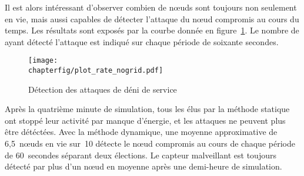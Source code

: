 Il est alors intéressant d'observer combien de nœuds sont toujours non seulement en vie, mais aussi capables de détecter l'attaque du nœud compromis au cours du temps.
Les résultats sont exposés par la courbe donnée en figure~\ref{sa:fig:detection-dos}.
Le nombre de \cns ayant détecté l'attaque est indiqué sur chaque période de soixante secondes.
\begin{figure}[H]
    \centering
    \texttt{[image: \\chapterfig/plot\_rate\_nogrid.pdf]}
    \caption{Détection des attaques de déni de service}\label{sa:fig:detection-dos}
\end{figure}
Après la quatrième minute de simulation, tous les \cns élus par la méthode statique ont stoppé leur activité par manque d'énergie, et les attaques ne peuvent plus être détéctées.
Avec la méthode dynamique, une moyenne approximative de 6,5~nœuds en vie sur~10 détecte le nœud compromis au cours de chaque période de 60~secondes séparant deux élections.
Le capteur malveillant est toujours détecté par plus d'un nœud en moyenne après une demi-heure de simulation.
